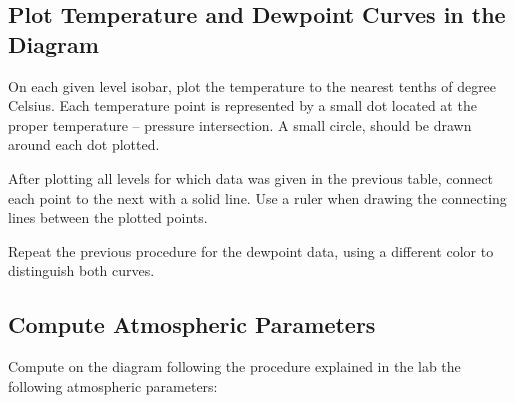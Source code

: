 \documentclass{article}
\begin{document}
\subsection{Plot Temperature and Dewpoint Curves in the Diagram}

On each given level isobar, plot the temperature to the
nearest tenths of degree Celsius. Each temperature point is represented by a small dot
located at the proper temperature -- pressure intersection. A small
circle, should be drawn around each dot plotted. 

After plotting all levels for which data was given in the previous table, connect each
point to the next with a solid line. Use a ruler
when drawing the connecting lines between the plotted points.


Repeat the previous procedure for the dewpoint data, using a different color to
distinguish both curves.

\subsection{Compute Atmospheric Parameters}

Compute on the diagram following the procedure explained in the lab
the following atmospheric parameters:
\end{document}
